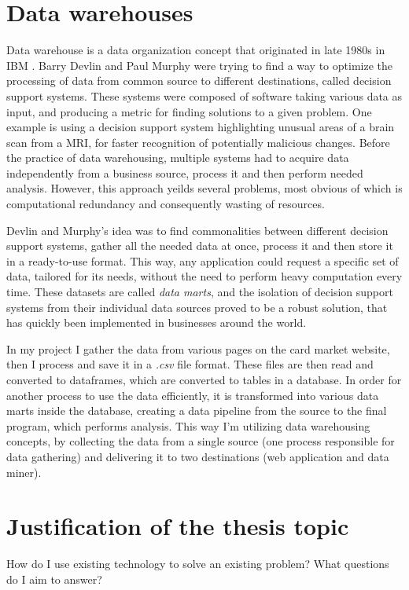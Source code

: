 \section{Data warehouses}
Data warehouse is a data organization concept that originated in late 1980s in IBM \cite{dataWarehouses}. Barry Devlin and Paul Murphy were trying to find a way to optimize the processing of data from common source to different destinations, called decision support systems. These systems were composed of software taking various data as input, and producing a metric for finding solutions to a given problem. One example is using a decision support system highlighting unusual areas of a brain scan from a MRI, for faster recognition of potentially malicious changes. Before the practice of data warehousing, multiple systems had to acquire data independently from a business source, process it and then perform needed analysis. However, this approach yeilds several problems, most obvious of which is computational redundancy and consequently wasting of resources. \par
Devlin and Murphy's idea was to find commonalities between different decision support systems, gather all the needed data at once, process it and then store it in a ready-to-use format. This way, any application could request a specific set of data, tailored for its needs, without the need to perform heavy computation every time. These datasets are called \textit{data marts}, and the isolation of decision support systems from their individual data sources proved to be a robust solution, that has quickly been implemented in businesses around the world. \par
In my project I gather the data from various pages on the card market website, then I process and save it in a \textit{.csv} file format. These files are then read and converted to dataframes, which are converted to tables in a database. In order for another process to use the data efficiently, it is transformed into various data marts inside the database, creating a data pipeline from the source to the final program, which performs analysis. This way I'm utilizing data warehousing concepts, by collecting the data from a single source (one process responsible for data gathering) and delivering it to two destinations (web application and data miner).


\section{Justification of the thesis topic}
How do I use existing technology to solve an existing problem?
What questions do I aim to answer?
